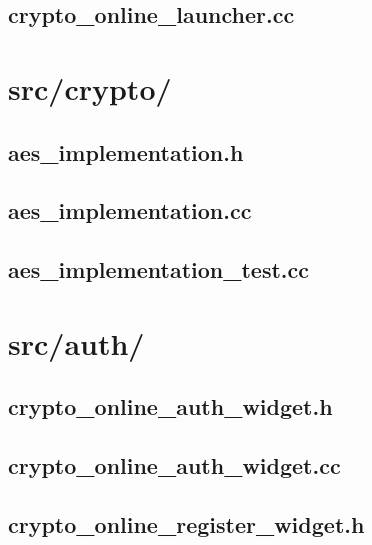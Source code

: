 \subsection{crypto\_online\_launcher.cc}

\newpage


\section{src/crypto/}

\subsection{aes\_implementation.h}

\newpage

\subsection{aes\_implementation.cc}

\newpage

\subsection{aes\_implementation\_test.cc}

\newpage

\section{src/auth/}

\subsection{crypto_online_auth_widget.h}

\newpage

\subsection{crypto_online_auth_widget.cc}

\newpage

\subsection{crypto_online_register_widget.h}

\newpage

